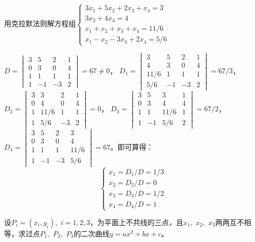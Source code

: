 \begin{eg}
用克拉默法则解方程组$\begin{cases}
3x_1 + 5x_2 + 2x_3 + x_4 = 3 \\
3x_2 + 4x_4 = 4 \\
x_1 + x_2 + x_3 + x_4 = 11/6 \\
x_1 - x_2 - 3x_3 + 2x_4 = 5/6
\end{cases}$
\end{eg}

\begin{solution}
$D = \begin{vmatrix} 3 & 5 & 2 & 1 \\ 0 & 3 & 0 & 4 \\ 1 & 1 & 1 & 1 \\ 1 & -1 & -3 & 2 \end{vmatrix} = 67 \neq 0$，
$D_1 = \begin{vmatrix} 3 & 5 & 2 & 1 \\ 4 & 3 & 0 & 4 \\ 11/6 & 1 & 1 & 1 \\ 5/6 & -1 & -3 & 2 \end{vmatrix} = 67/3$，
$D_2 = \begin{vmatrix} 3 & 3 & 2 & 1 \\ 0 & 4 & 0 & 4 \\ 1 & 11/6 & 1 & 1 \\ 1 & 5/6 & -3 & 2 \end{vmatrix} = 0$，
$D_3 = \begin{vmatrix} 3 & 5 & 3 & 1 \\ 0 & 3 & 4 & 4 \\ 1 & 1 & 11/6 & 1 \\ 1 & -1 & 5/6 & 2 \end{vmatrix} = 67/2$，
$D_4 = \begin{vmatrix} 3 & 5 & 2 & 3 \\ 0 & 3 & 0 & 4 \\ 1 & 1 & 1 & 11/6 \\ 1 & -1 & -3 & 5/6 \end{vmatrix} =67$。即可算得：
$$
\begin{cases}
x_1 = D_1/D = 1/3 \\ x_2 = D_2/D = 0 \\ x_3 = D_3/D = 1/2 \\ x_4 = D_4/D = 1
\end{cases}$$
\end{solution}

\begin{eg}
设$P_i = (x_i ,y_i),$ $i=1, 2, 3$，为平面上不共线的三点，且$x_1,$ $x_2,$ $x_3$两两互不相等，求过点$P_1,$ $P_2,$ $P_3$的二次曲线$y = ax^2+bx+c$。
\end{eg}

